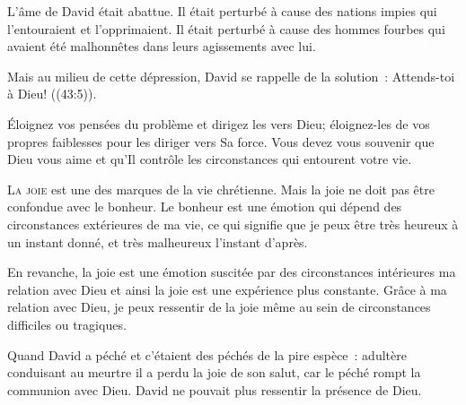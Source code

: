 L'âme de David était abattue. Il était perturbé à cause des nations impies
 qui l'entouraient et l'opprimaient.
 Il était perturbé à cause des hommes fourbes qui avaient été malhonnêtes
 dans leurs agissements avec lui. 

Mais au milieu de cette dépression, David se rappelle de la solution~:
 \Og Attends-toi à Dieu! \Fg{} ((43:5)).



Éloignez vos pensées du problème et dirigez les vers Dieu;
 éloignez-les de vos propres faiblesses pour les diriger vers Sa force.
 Vous devez vous souvenir que Dieu vous aime et qu'Il contrôle
 les circonstances qui entourent votre vie. 

\dvrule






\lettrine{L}{a joie} est une des marques de la vie chrétienne.
 Mais la joie ne doit pas être confondue avec le bonheur.
 Le bonheur est une émotion qui dépend des circonstances
 extérieures de ma vie, ce qui signifie que je peux être très heureux
 à un instant donné, et très malheureux l'instant d'après. 

En revanche, la joie est une émotion suscitée par des circonstances
 intérieures \ocadr ma relation avec Dieu \fcadr{} et ainsi la joie
 est une expérience plus constante.
 Grâce à ma relation avec Dieu, je peux ressentir de la joie
 même au sein de circonstances difficiles ou tragiques. 

Quand David a péché \ocadr et c'étaient des péchés de la pire espèce~:
 adultère conduisant au meurtre \fcadr{} il a perdu la joie de son salut,
 car le péché rompt la communion avec Dieu.
 David ne pouvait plus ressentir la présence de Dieu. 


